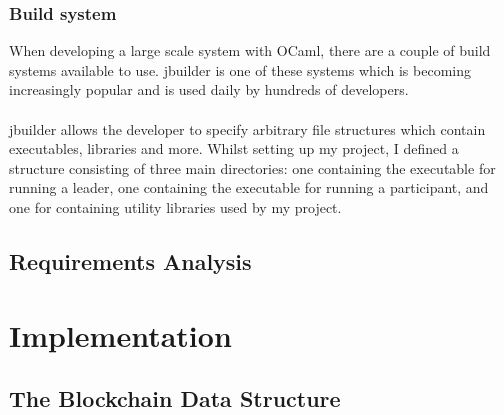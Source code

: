 \documentclass[12pt,a4paper,twoside,openright]{report}
\begin{document}
		\subsection*{Build system}
		When developing a large scale system with OCaml, there are a couple of build systems available to use. jbuilder \cite{jbuilder} is one of these systems which is becoming increasingly popular and is used daily by hundreds of developers.\\
		\\
		jbuilder allows the developer to specify arbitrary file structures which contain executables, libraries and more. Whilst setting up my project, I defined a structure consisting of three main directories: one containing the executable for running a leader, one containing the executable for running a participant, and one for containing utility libraries used by my project. 
	\section{Requirements Analysis}
	\chapter{Implementation}
	\section{The Blockchain Data Structure}
\end{document}
